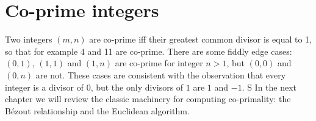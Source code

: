 \section{Co-prime integers}
\label{sec:coprime}
Two integers $(m,n)$ are co-prime iff%
their greatest common divisor is equal to 1, so that for example 4 and 11 are co-prime. There are some fiddly edge cases:  $(0,1)$, $(1,1)$ and $(1,n)$ are co-prime for integer $n>1$, but $(0,0)$ and $(0,n)$ are not. These cases are consistent with the observation that  every integer is a divisor of $0$, but the only divisors of $1$ are $1$ and $-1$. S In the next chapter we will review the classic machinery for computing co-primality:  the B{\'e}zout relationship and the Euclidean algorithm. 
% 
